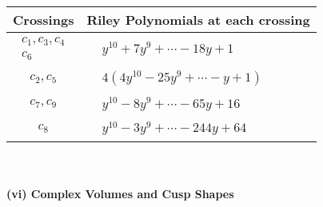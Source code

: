 \documentclass[1p]{elsarticle_modified}
\theoremstyle{definition}
\begin{document}
\begin{tabular}{m{50pt}|m{274pt}}
Crossings & \hspace{64pt}Riley Polynomials at each crossing \\
\hline $$\begin{aligned}c_{1},c_{3},c_{4}\\c_{6}\end{aligned}$$&$\begin{aligned}
&y^{10}+7 y^9+\cdots-18 y+1
\end{aligned}$\\
\hline $$\begin{aligned}c_{2},c_{5}\end{aligned}$$&$\begin{aligned}
&4(4 y^{10}-25 y^9+\cdots- y+1)
\end{aligned}$\\
\hline $$\begin{aligned}c_{7},c_{9}\end{aligned}$$&$\begin{aligned}
&y^{10}-8 y^9+\cdots-65 y+16
\end{aligned}$\\
\hline $$\begin{aligned}c_{8}\end{aligned}$$&$\begin{aligned}
&y^{10}-3 y^9+\cdots-244 y+64
\end{aligned}$\\
\hline
\end{tabular}\\~\\
\newpage\flushleft \textbf{(vi) Complex Volumes and Cusp Shapes}
\end{document}

